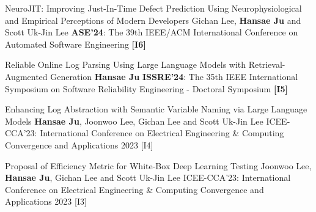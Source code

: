 

\begin{cventries}

\pbentry
  {\faStar[regular] NeuroJIT: Improving Just-In-Time Defect Prediction Using Neurophysiological and Empirical Perceptions of Modern Developers }  %
  {Gichan Lee, \textbf{Hansae Ju} and Scott Uk-Jin Lee}
  {\textbf{ASE'24}: The 39th IEEE/ACM International Conference on Automated Software Engineering}
  {\href{https://doi.org/10.1145/3691620.3695056}{\paper}}
  {\href{https://github.com/Verssae/NeuroJIT}{\githubCode}}
  {\textbf{[I6]}}

 \pbentry
  {\faStar[regular] Reliable Online Log Parsing Using Large Language Models with Retrieval-Augmented Generation } %
  {\textbf{Hansae Ju}}
  {\textbf{ISSRE'24}: The 35th IEEE International Symposium on Software Reliability Engineering - Doctoral Symposium}
  {\href{https://doi.org/10.1109/ISSREW63542.2024.00055}{\paper}}
  {\href{https://github.com/Verssae/RAGLogParser}{\githubCode}}
  {\textbf{[I5]}}


  \pbentry
  {Enhancing Log Abstraction with Semantic Variable Naming via Large Language Models } %
  {\textbf{Hansae Ju}, Joonwoo Lee, Gichan Lee and Scott Uk-Jin Lee}
  {ICEE-CCA'23: International Conference on Electrical Engineering \& Computing Convergence and Applications 2023}
  {\href{https://github.com/Verssae/Verssae/blob/3f89da13976aaa5cbd1e3bdce61926b392d6e797/assets/papers/ICEE-CCA\%2023/Enhancing\%20Log\%20Abstraction\%20with\%20Semantic\%20Variable\%20Naming\%20via\%20Large\%20Language\%20Models.pdf}{\paper}}
  {\href{https://github.com/Verssae/LogParsingGPT}{\githubCode}}
  {[I4]}

  \pbentry
  {Proposal of Efficiency Metric for White-Box Deep Learning Testing } %
  {Joonwoo Lee, \textbf{Hansae Ju}, Gichan Lee and Scott Uk-Jin Lee}
  {ICEE-CCA'23: International Conference on Electrical Engineering \& Computing Convergence and Applications 2023}
  {\href{https://github.com/Verssae/Verssae/blob/3f89da13976aaa5cbd1e3bdce61926b392d6e797/assets/papers/ICEE-CCA\%2023/Proposal\%20of\%20Efficiency\%20Metric\%20for\%20White-Box\%20Deep\%20Learning\%20Testing.pdf}{\paper}}
  {}
  {[I3]}


\end{cventries}
